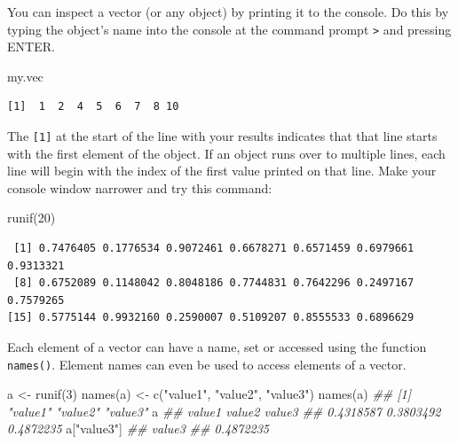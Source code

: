 \documentclass[
  13,
  letterpaper,
]{report}
\newenvironment{Shaded}{\begin{snugshade}}{\end{snugshade}}
\newcommand{\DecValTok}[1]{\textcolor[rgb]{0.68,0.00,0.00}{#1}}
\newcommand{\DocumentationTok}[1]{\textcolor[rgb]{0.37,0.37,0.37}{\textit{#1}}}
\newcommand{\FunctionTok}[1]{\textcolor[rgb]{0.28,0.35,0.67}{#1}}
\newcommand{\NormalTok}[1]{\textcolor[rgb]{0.00,0.23,0.31}{#1}}
\newcommand{\OtherTok}[1]{\textcolor[rgb]{0.00,0.23,0.31}{#1}}
\newcommand{\StringTok}[1]{\textcolor[rgb]{0.13,0.47,0.30}{#1}}
\begin{document}
You can inspect a vector (or any object) by printing it to the console.
Do this by typing the object's name into the console at the command
prompt \texttt{\textgreater{}} and pressing ENTER.

\begin{Shaded}
\begin{Highlighting}[]
\NormalTok{my.vec}
\end{Highlighting}
\end{Shaded}

\begin{verbatim}
[1]  1  2  4  5  6  7  8 10
\end{verbatim}

The \texttt{{[}1{]}} at the start of the line with your results
indicates that that line starts with the first element of the object. If
an object runs over to multiple lines, each line will begin with the
index of the first value printed on that line. Make your console window
narrower and try this command:

\begin{Shaded}
\begin{Highlighting}[]
\FunctionTok{runif}\NormalTok{(}\DecValTok{20}\NormalTok{)}
\end{Highlighting}
\end{Shaded}

\begin{verbatim}
 [1] 0.7476405 0.1776534 0.9072461 0.6678271 0.6571459 0.6979661 0.9313321
 [8] 0.6752089 0.1148042 0.8048186 0.7744831 0.7642296 0.2497167 0.7579265
[15] 0.5775144 0.9932160 0.2590007 0.5109207 0.8555533 0.6896629
\end{verbatim}

Each element of a vector can have a name, set or accessed using the
function \texttt{names()}. Element names can even be used to access
elements of a vector.

\begin{Shaded}
\begin{Highlighting}[]
\NormalTok{a }\OtherTok{\textless{}{-}} \FunctionTok{runif}\NormalTok{(}\DecValTok{3}\NormalTok{)}
\FunctionTok{names}\NormalTok{(a) }\OtherTok{\textless{}{-}} \FunctionTok{c}\NormalTok{(}\StringTok{"value1"}\NormalTok{, }\StringTok{"value2"}\NormalTok{, }\StringTok{"value3"}\NormalTok{)}
\FunctionTok{names}\NormalTok{(a)}
\DocumentationTok{\#\# [1] "value1" "value2" "value3"}
\NormalTok{a}
\DocumentationTok{\#\#    value1    value2    value3 }
\DocumentationTok{\#\# 0.4318587 0.3803492 0.4872235}
\NormalTok{a[}\StringTok{"value3"}\NormalTok{]}
\DocumentationTok{\#\#    value3 }
\DocumentationTok{\#\# 0.4872235}
\end{Highlighting}
\end{Shaded}
\end{document}
